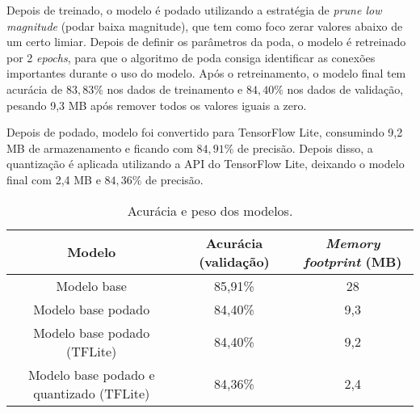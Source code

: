 Depois de treinado, o modelo é podado utilizando a estratégia de \textit{prune low magnitude} (podar baixa magnitude),
que tem como foco zerar valores abaixo de um certo limiar. Depois de definir os parâmetros da poda, o modelo é
retreinado por 2 \textit{epochs}, para que o algoritmo de poda consiga identificar as conexões importantes durante o
uso do modelo. Após o retreinamento, o modelo final tem acurácia de $83,83\%$ nos dados de treinamento e $84,40\%$
nos dados de validação, pesando 9,3 MB após remover todos os valores iguais a zero.

Depois de podado, modelo foi convertido para TensorFlow Lite, consumindo 9,2 MB de armazenamento e ficando com
$84,91\%$ de precisão. Depois disso, a quantização é aplicada utilizando a API do TensorFlow Lite, deixando o modelo
final com 2,4 MB e $84,36\%$ de precisão.


\begin{center}
\begin{table}[htb]
\centering
\ABNTEXfontereduzida
\caption[Acurácia e peso dos modelos]{Acurácia e peso dos modelos.}
\label{tabela_acuracia_peso}
\begin{tabular}{ |c|c|c| }
	\hline
	\textbf{Modelo} & \textbf{Acurácia (validação)}  & \textbf{\textit{Memory footprint} (MB)} \\
	\hline
	Modelo base 				 & 	85,91\% 	& 	28	\\
	Modelo base podado 			 & 	84,40\% 	& 	9,3	\\
	Modelo base podado (TFLite) 		 & 	84,40\% 	& 	9,2	\\
	Modelo base podado e quantizado (TFLite) & 	84,36\% 	& 	2,4	\\
	\hline
\end{tabular}
\end{table}
\end{center}
